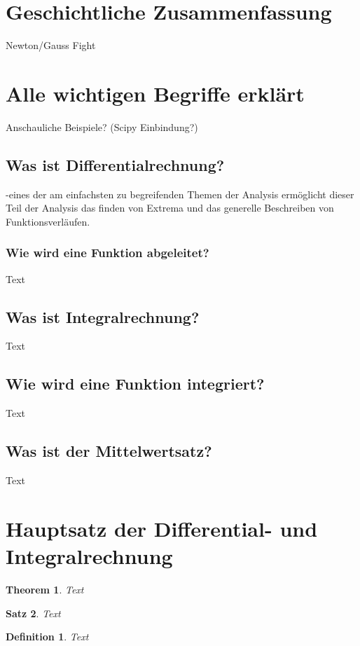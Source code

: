 \documentclass[fontsize=12pt,paper=a4,DIV12,cleardoublepage=empty, 
liststotoc,idxtotoc,bibtotoc]{article}
\theoremstyle{plain}
\newtheorem{satz}{Satz}[subsection]
\newtheorem{theo}[satz]{Theorem}
\newtheorem{defi}{Definition}
\theoremstyle{definition}
\begin{document}
	
	\section{Geschichtliche Zusammenfassung}
	Newton/Gauss Fight
	
	

	\section{Alle wichtigen Begriffe erklärt}
	Anschauliche Beispiele? (Scipy Einbindung?)
	
	
	\subsection{Was ist Differentialrechnung?}
	-eines der am einfachsten zu begreifenden Themen der Analysis ermöglicht dieser Teil der Analysis das finden von Extrema und das generelle Beschreiben von Funktionsverläufen.
	
	
	\subsubsection{Wie wird eine Funktion abgeleitet?}
		Text
	
	
	\subsection{Was ist Integralrechnung?}
		Text


	\subsection{Wie wird eine Funktion integriert?}
		Text
		
	
	\subsection{Was ist der Mittelwertsatz?}
		Text
	
	
	
	\section{Hauptsatz der Differential- und Integralrechnung}
	
	\begin{theo}
		Text
	\end{theo}
	
	\begin{satz}
		Text
	\end{satz}
	
	\begin{defi}
		Text
	\end{defi}
\end{document}
